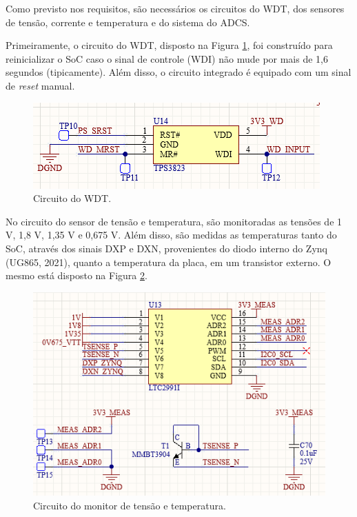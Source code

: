 Como previsto nos requisitos, são necessários os circuitos do WDT, dos sensores de tensão, corrente e temperatura e do sistema do ADCS. 

Primeiramente, o circuito do WDT, disposto na Figura \ref{fig:wdt}, foi construído para reinicializar o SoC caso o sinal de controle (WDI) não mude por mais de 1,6 segundos (tipicamente). Além disso, o circuito integrado é equipado com um sinal de \textit{reset} manual. 

\begin{figure}[H]
    \centering
    \includegraphics[scale=0.7]{images/wdt.png}
    \caption{Circuito do WDT.}
    \label{fig:wdt}
\end{figure}

No circuito do sensor de tensão e temperatura, são monitoradas as tensões de 1 V, 1,8 V, 1,35 V e  0,675 V. Além disso, são medidas as temperaturas tanto do SoC, através dos sinais DXP e DXN, provenientes do diodo interno do Zynq (UG865, 2021), quanto a temperatura da placa, em um transistor externo. O mesmo está disposto na Figura \ref{fig:sense}.

\begin{figure}[H]
    \centering
    \includegraphics[scale=0.7]{images/sense.png}
    \caption{Circuito do monitor de tensão e temperatura.}
    \label{fig:sense}
\end{figure}

